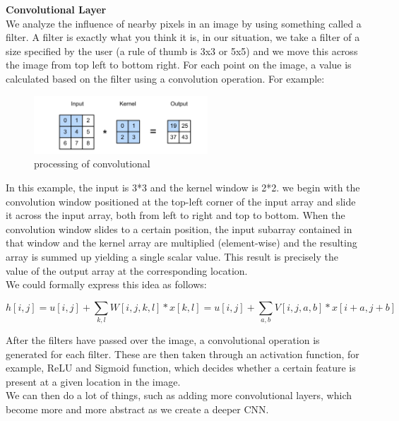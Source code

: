 \documentclass{article}
\begin{document}
\textbf{Convolutional Layer}\\[5]
We analyze the influence of nearby pixels in an image by using something called a filter. A filter is exactly what you think it is, in our situation, we take a filter of a size specified by the user (a rule of thumb is 3x3 or 5x5) and we move this across the image from top left to bottom right. For each point on the image, a value is calculated based on the filter using a convolution operation. For example:\\
\begin{figure}[htbp]
\centering
\includegraphics[width=6.5cm]{convolution.png}
\caption{processing of convolutional}
\end{figure}

In this example, the input is 3*3 and the kernel window is 2*2. we begin with the convolution window positioned at the top-left corner of the input array and slide it across the input array, both from left to right and top to bottom. When the convolution window slides to a certain position, the input subarray contained in that window and the kernel array are multiplied (element-wise) and the resulting array is summed up yielding a single scalar value. This result is precisely the value of the output array at the corresponding location.\\[2]
We could formally express this idea as follows:

$$h[i,j] = u[i,j] + \sum_{k,l} W[i,j,k,l]*x[k,l] = u[i,j] + \sum_{a,b} V[i,j,a,b]*x[i+a,j+b]$$

After the filters have passed over the image, a convolutional operation is generated for each filter. These are then taken through an activation function, for example, ReLU and Sigmoid function, which decides whether a certain feature is present at a given location in the image.\\
We can then do a lot of things, such as adding more convolutional layers, which become more and more abstract as we create a deeper CNN. \\
\end{document}
